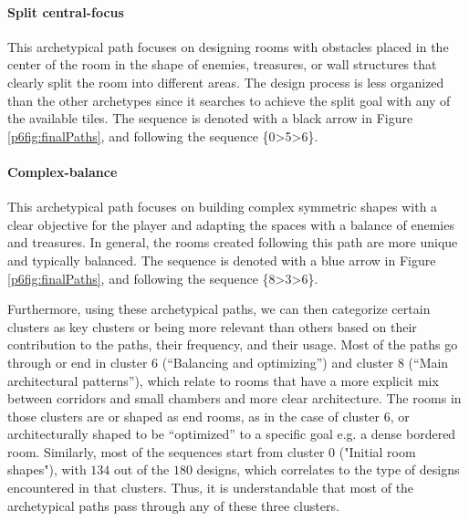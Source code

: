 \paragraph{Split central-focus}This archetypical path focuses on designing rooms with obstacles placed in the center of the room in the shape of enemies, treasures, or wall structures that clearly split the room into different areas. The design process is less organized than the other archetypes since it searches to achieve the split goal with any of the available tiles. The sequence is denoted with a black arrow in Figure \ref{p6fig:finalPaths}, and following the sequence \{0\textgreater5\textgreater6\}.

\paragraph{Complex-balance}This archetypical path focuses on building complex symmetric shapes with a clear objective for the player and adapting the spaces with a balance of enemies and treasures. In general, the rooms created following this path are more unique and typically balanced. %
The sequence is denoted with a blue arrow in Figure \ref{p6fig:finalPaths}, and following the sequence \{8\textgreater3\textgreater6\}.

Furthermore, using these archetypical paths, we can then categorize certain clusters as key clusters or being more relevant than others based on their contribution to the paths, their frequency, and their usage. Most of the paths go through or end in cluster 6 (``Balancing and optimizing'') and cluster 8 (``Main architectural patterns''), which relate to rooms that have a more explicit mix between corridors and small chambers and more clear architecture. The rooms in those clusters are or shaped as end rooms, as in the case of cluster 6, or architecturally shaped to be “optimized” to a specific goal e.g. a dense bordered room. Similarly, most of the sequences start from cluster 0 ("Initial room shapes"), with $134$ out of the $180$ designs, which correlates to the type of designs encountered in that clusters. Thus, it is understandable that most of the archetypical paths pass through any of these three clusters. 

